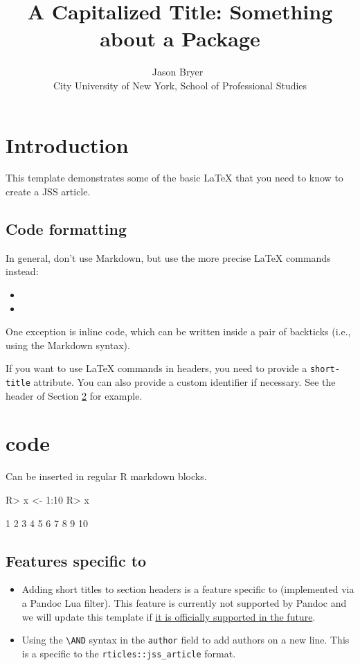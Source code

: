 \documentclass[
]{jss}
\author{
Jason Bryer~\orcidlink{0000-0002-2454-0402}\\City University of New
York, School of Professional Studies
}
\title{A Capitalized Title: Something about a Package \pkg{foo}}
\providecommand{\tightlist}{%
  \setlength{\itemsep}{0pt}\setlength{\parskip}{0pt}}
\begin{document}
\section{Introduction}\label{introduction}

This template demonstrates some of the basic LaTeX that you need to know
to create a JSS article.

\subsection{Code formatting}\label{code-formatting}

In general, don't use Markdown, but use the more precise LaTeX commands
instead:

\begin{itemize}
\item
\item
\end{itemize}

One exception is inline code, which can be written inside a pair of
backticks (i.e., using the Markdown syntax).

If you want to use LaTeX commands in headers, you need to provide a
\texttt{short-title} attribute. You can also provide a custom identifier
if necessary. See the header of Section \ref{r-code} for example.

\section[R code]{ code}\label{r-code}

Can be inserted in regular R markdown blocks.

\begin{CodeChunk}
\begin{CodeInput}
R> x <- 1:10
R> x
\end{CodeInput}
\begin{CodeOutput}
 [1]  1  2  3  4  5  6  7  8  9 10
\end{CodeOutput}
\end{CodeChunk}

\subsection[Features specific to rticles]{Features specific to
}\label{features-specific-to}

\begin{itemize}
\tightlist
\item
  Adding short titles to section headers is a feature specific to
   (implemented via a Pandoc Lua filter). This feature is
  currently not supported by Pandoc and we will update this template if
  \href{https://github.com/jgm/pandoc/issues/4409}{it is officially
  supported in the future}.
\item
  Using the \texttt{\textbackslash{}AND} syntax in the \texttt{author}
  field to add authors on a new line. This is a specific to the
  \texttt{rticles::jss\_article} format.
\end{itemize}
\end{document}
